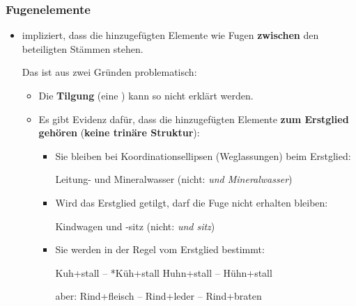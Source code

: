 \begin{frame}
\frametitle{Fugenelemente}

\begin{itemize}
	\item {} impliziert, dass die hinzugefügten Elemente wie Fugen \textbf{zwischen} den beteiligten Stämmen stehen. 
	
\medskip 
	
	Das ist aus zwei Gründen problematisch:

	\begin{itemize}
		\item Die \textbf{Tilgung} (eine ) kann so nicht erklärt werden.
		\item Es gibt Evidenz dafür, dass die hinzugefügten Elemente \textbf{zum Erstglied gehören} (\dash \textbf{keine trinäre Struktur}):

\pause 

\medskip 
	
	\begin{itemize}
		\item Sie bleiben bei Koordinationsellipsen (Weglassungen) beim Erstglied:
		
		\ea Leitung- und Mineral\alertred{\_}wasser (nicht: \emph{und Mineralwasser})
		\z

\pause 
		
		\item Wird das Erstglied getilgt, darf die Fuge nicht erhalten bleiben:
		
		\ea Kindwagen und -sitz (nicht: \emph{und sitz})
		\z

\pause 
		
		\item Sie werden in der Regel vom Erstglied bestimmt:
		
		\ea Kuh+stall -- *Küh+stall \vs *Huhn+stall -- Hühn+stall
		\z
		
		\ea aber: Rind\alertred{\_}+fleisch -- Rind+leder -- Rind+braten
		\z
		
	\end{itemize}


\end{itemize}
\end{itemize}
\end{frame}


